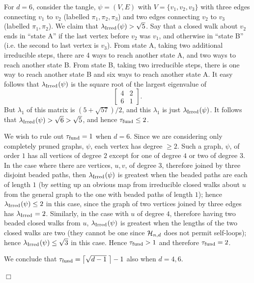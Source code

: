\documentclass[12pt]{article}
\newcommand{\ch}{{\cal H}}
\newcommand{\chnd}{\ch_{n,d}}
\newcommand{\fund}{{\rm fund}}
\newcommand{\taufund}{{\tau_\fund}}
\newcommand{\tang}{{\psi}}	%
\newcommand{\proofbox}{\begin{flushright}$\Box$\end{flushright}}
\newcommand{\ird}[1]{{\rm Irred}_{#1}}
\begin{document}
For $d=6$, consider the tangle, $\tang=(V,E)$ with $V=\{v_1,v_2,v_3\}$
with three edges connecting $v_1$ to $v_2$ (labelled $\pi_1,\pi_2,\pi_3$)
and two edges connecting
$v_2$ to $v_3$ (labelled $\pi_1,\pi_2$).
We claim that $\lambda_{\ird{}}(\tang)>\sqrt{5}$.  Say that a
closed walk about $v_2$ ends in ``state A'' if the last vertex before $v_2$
was $v_1$, and otherwise in ``state B'' (i.e. the second to last vertex
is $v_3$).  From state A, taking two additional irreducible steps, there
are 4 ways to reach another state A, and two ways to reach another state B.
From state B, taking two irreducible steps, there is one way to reach
another state B and six ways to reach another state A.  It easy follows
that $\lambda_{\ird{}}(\tang)$ is the square root of the largest eigenvalue
of
\begin{equation}\label{eq:d6tangle}
\left[ \begin{array}{cc}4&2\\6&1\end{array}\right].
\end{equation}
But $\lambda_1$ of this matrix is $(5+\sqrt{57})/2$, and this $\lambda_1$
is just
$\lambda_{\ird{}}(\tang)$.
It follows that $\lambda_{\ird{}}(\tang)>\sqrt{6}>\sqrt{5}$, and hence
$\taufund\le 2$.

We wish to rule out $\taufund=1$ when $d=6$.  Since we are considering only
completely pruned graphs, $\tang$,
each vertex has degree $\ge 2$.  Such a graph, $\tang$, of
order $1$ has all vertices of degree $2$ except for one of degree $4$ or
two of degree $3$.  In the case where there are vertices, $u,v$,
of degree $3$, therefore joined
by three disjoint beaded paths, then $\lambda_{\ird{}}(\tang)$ is greatest when
the beaded paths are each of length $1$ (by setting up an obvious map from
irreducible closed walks about $u$ from the general graph to the one with 
beaded paths
of length $1$); hence $\lambda_{\ird{}}(\tang)\le 2$ in this case,
since the graph of two vertices joined by three edges has 
$\lambda_{\ird{}}=2$.  Similarly,
in the case with $u$ of degree $4$, therefore having two beaded closed walks
from $u$, $\lambda_{\ird{}}(\tang)$ is greatest when the lengths of the two
closed walks are two (they cannot be one since $\chnd$ does not permit self-loops);
hence $\lambda_{\ird{}}(\tang)\le \sqrt{3}$ in this case.
Hence $\taufund>1$ and therefore $\taufund=2$.

We conclude that $\taufund=
\bigl\lceil \sqrt{d-1} \;\bigr\rceil-1$ also when $d=4,6$.
\proofbox
\end{document}
